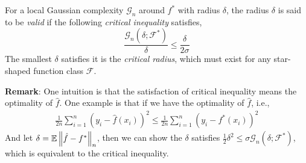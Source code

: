 \begin{definition}
For a local Gaussian complexity $\mathcal{G}_{n}$ around $f^*$ with radius $\delta$, the radius $\delta$ is said to be \textit{valid} if the following \textit{critical inequality} satisfies,
$$
\frac{\mathcal{G}_{n}\left(\delta ; \mathcal{F}^{*}\right)}{\delta} \leq \frac{\delta}{2 \sigma}
$$
The smallest $\delta$ satisfies it is the \textit{critical radius}, which must exist for any star-shaped function class $\mathcal{F}$.
\end{definition}

\textbf{Remark}: One intuition is that the satisfaction of critical inequality means the optimality of $\hat{f}$. One example is that if we have the optimality of $\hat{f}$, i.e.,
\begin{align*}
    \frac{1}{2 n} \sum_{i=1}^{n}\left(y_{i}-\widehat{f}\left(x_{i}\right)\right)^{2} \leq \frac{1}{2 n} \sum_{i=1}^{n}\left(y_{i}-f^{*}\left(x_{i}\right)\right)^{2}
\end{align*}
And let $\delta = \mathbb{E} \left\lVert \hat{f} - f^* \right\rVert_n$, then we can show the $\delta$ satisfies $\frac{1}{2} \delta^{2} \leq \sigma \mathcal{G}_{n}\left(\delta ; \mathcal{F}^{*}\right)$, which is equivalent to the critical inequality.


